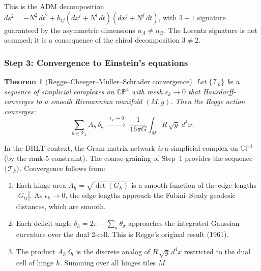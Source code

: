 \documentclass[12pt]{article}
\newtheorem{theorem}{Theorem}[section]
\theoremstyle{remark}
\theoremstyle{definition}
\begin{document}
This is the ADM decomposition $ds^2 = -N^2\,dt^2 + h_{ij}(dx^i + N^i\,dt)(dx^j + N^j\,dt)$, with $3+1$ signature guaranteed by the asymmetric dimensions $n_A \ne n_B$.  The Lorentz signature is not assumed; it is a consequence of the chiral decomposition $3 \ne 2$.

\subsubsection{Step 3: Convergence to Einstein's equations}

\begin{theorem}[Regge--Cheeger--M\"uller--Schrader convergence]
\label{thm:regge_convergence}
Let $\{\mathcal{T}_k\}$ be a sequence of simplicial complexes on $\mathbb{CP}^4$ with mesh $\epsilon_k \to 0$ that Hausdorff-converges to a smooth Riemannian manifold $(M, g)$.  Then the Regge action converges:
\begin{equation}
\sum_{h \in \mathcal{T}_k} A_h\,\delta_h \;\xrightarrow{\;\epsilon_k \to 0\;}\; \frac{1}{16\pi G}\int_M R\,\sqrt{g}\;d^4x.
\end{equation}
\end{theorem}

In the DRLT context, the Gram-matrix network \emph{is} a simplicial complex on $\mathbb{CP}^4$ (by the rank-5 constraint).  The coarse-graining of Step~1 provides the sequence $\{\mathcal{T}_k\}$.  Convergence follows from:

\begin{enumerate}
\item Each hinge area $A_h = \sqrt{\det(G_h)}$ is a smooth function of the edge lengths $|G_{ij}|$.  As $\epsilon_k \to 0$, the edge lengths approach the Fubini--Study geodesic distances, which are smooth.

\item Each deficit angle $\delta_h = 2\pi - \sum_\sigma \theta_\sigma$ approaches the integrated Gaussian curvature over the dual 2-cell.  This is Regge's original result (1961).

\item The product $A_h\,\delta_h$ is the discrete analog of $R\,\sqrt{g}\,d^4x$ restricted to the dual cell of hinge $h$.  Summing over all hinges tiles $M$.
\end{enumerate}
\end{document}
